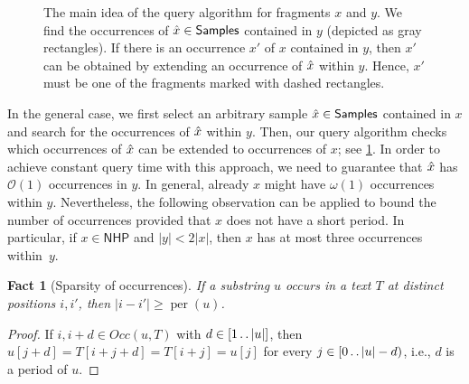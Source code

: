 \documentclass[a4paper]{article}
\newtheorem{fact}[theorem]{Fact}
\theoremstyle{definition}
\theoremstyle{remark}
\newcommand{\R}{\mathsf{Samples}}
\newcommand{\N}{\mathsf{NHP}}
\newcommand{\dd}{\mathinner{\ldotp\ldotp}}
\DeclareMathOperator{\per}{per}
\newcommand{\Occ}{\mathit{Occ}}
\newcommand{\Oh}{\mathcal{O}}
\begin{document}
\begin{figure}[h]
\begin{center}
\end{center}
   \caption{\label{fig:repr}
  The main idea of the query algorithm for fragments $x$ and $y$.
  We find the occurrences of $\rx \in \R$ contained in $y$ (depicted as gray rectangles).
  If there is an occurrence $x'$ of $x$ contained in $y$, then $x'$
  can be obtained by extending an occurrence of $\hat{x}$ within $y$.
  Hence, $x'$ must be one of the fragments marked with dashed rectangles. 
  }
  \end{figure}

In the general case, we first select an arbitrary sample $\rx\in \R$ contained in $x$
and search for the occurrences of $\hat{x}$ within $y$. 
Then, our query algorithm checks which occurrences of $\hat{x}$ can be extended to occurrences of $x$; see \cref{fig:repr}.
In order to achieve constant query time with this approach, we need to guarantee that $\hat{x}$ has $\Oh(1)$  occurrences in $y$. 
In general, already $x$ might have $\omega(1)$ occurrences within $y$.
Nevertheless, the following observation can be applied to bound the number of occurrences provided that $x$ does not have a short period.
In particular, if $x\in \N$ and $|y|<2|x|$, then $x$ has at most three occurrences within~$y$.

\begin{fact}[Sparsity of occurrences]\label{fct:far}
  If a substring $u$ occurs in a text $T$ at distinct positions $i,i'$, then $|i-i'|\ge \per(u)$.
  \end{fact}
  \begin{proof}
  If $i,i+d\in\Occ(u,T)$ with $d\in [1\dd |u|]$, then $u[j+d]=T[i+j+d]=T[i+j]=u[j]$ for every $j\in[0\dd |u|-d)$, i.e., $d$ is a period of $u$.
  \end{proof}
\end{document}

